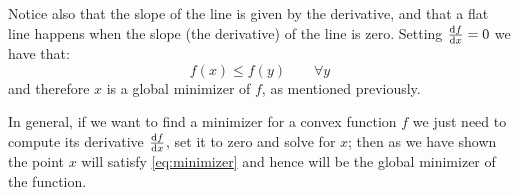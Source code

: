 Notice also that the slope of the line is given by the derivative, and that a flat line happens when the slope (the derivative) of the line is zero. Setting $\dv{f}{x} = 0$ we have that:
\begin{equation}\label{eq:minimizer}
	f(x) \leq f(y) \qquad \forall y
\end{equation}
and therefore $x$ is a global minimizer of $f$, as mentioned previously.

In general, if we want to find a minimizer for a convex function $f$ we just need to compute its derivative $\dv{f}{x}$, set it to zero and solve for $x$;  then as we have shown the point $x$ will satisfy \cref{eq:minimizer} and hence will be the global minimizer of the function.
